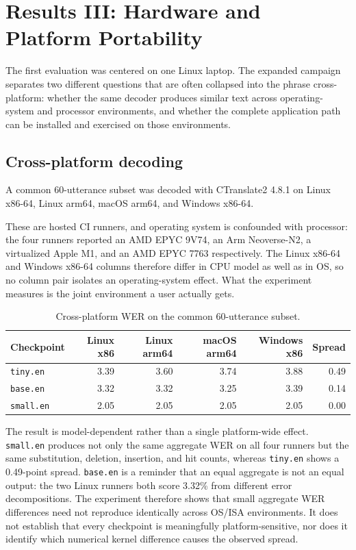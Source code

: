 \section{Results III: Hardware and Platform Portability}

The first \YazSes{} evaluation was centered on one Linux laptop. The expanded campaign separates
two different questions that are often collapsed into the phrase cross-platform: whether the
same decoder produces similar text across operating-system and processor environments, and
whether the complete application path can be installed and exercised on those environments.

\subsection{Cross-platform decoding}

A common 60-utterance subset was decoded with CTranslate2 4.8.1 on Linux x86-64, Linux arm64,
macOS arm64, and Windows x86-64.

These are hosted CI runners, and operating system is confounded with processor: the four
runners reported an AMD EPYC 9V74, an Arm Neoverse-N2, a virtualized Apple M1, and an AMD EPYC
7763 respectively. The Linux x86-64 and Windows x86-64 columns therefore differ in CPU model as
well as in OS, so no column pair isolates an operating-system effect. What the experiment
measures is the joint environment a user actually gets.

\begin{table}[ht]
\centering
\caption{Cross-platform WER on the common 60-utterance subset.}
\label{tab:platform}
\begin{tabular}{lrrrrr}
\toprule
Checkpoint & Linux x86 & Linux arm64 & macOS arm64 & Windows x86 & Spread \\
\midrule
\texttt{tiny.en}  & 3.39 & 3.60 & 3.74 & 3.88 & 0.49 \\
\texttt{base.en}  & 3.32 & 3.32 & 3.25 & 3.39 & 0.14 \\
\texttt{small.en} & 2.05 & 2.05 & 2.05 & 2.05 & 0.00 \\
\bottomrule
\end{tabular}
\end{table}

The result is model-dependent rather than a single platform-wide effect. \texttt{small.en}
produces not only the same aggregate WER on all four runners but the same substitution,
deletion, insertion, and hit counts, whereas \texttt{tiny.en} shows a 0.49-point spread.
\texttt{base.en} is a reminder that an equal aggregate is not an equal output: the two Linux
runners both score 3.32\% from different error decompositions. The experiment therefore shows
that small aggregate WER differences need not reproduce identically across OS/ISA environments.
It does not establish that every checkpoint is meaningfully platform-sensitive, nor does it
identify which numerical kernel difference causes the observed spread.


